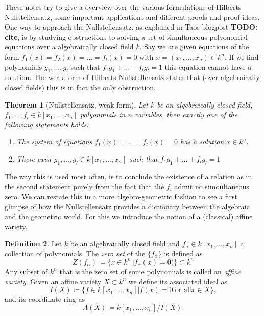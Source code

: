 \documentclass[11pt, a4paper, english, twoside]{article}
\theoremstyle{plain}
\newtheorem{theorem}{Theorem}[section]
\theoremstyle{definition}
\newtheorem{definition}[theorem]{Definition}
\begin{document}

These notes try to give a overview over the various formulations of Hilberts Nullstellensatz, some important applications and different proofs and proof-ideas.
One way to approach the Nullstellensatz, as explained in Taos blogpost \textbf{TODO: cite}, is by studying obstructions to solving a set of simultaneous polyonomial equations over a algebraically closed field $k$.
Say we are given equations of the form $f_1(x) = f_2(x) = \dots = f_l(x) = 0$ with $x = (x_1, \dots, x_n) \in k^n$. If we find polynomials $g_1, \dots, g_l$ such that $f_1g_1 + \dots + f_lg_l = 1$ this equation cannot have a
solution. The weak form of Hilberts Nullstellensatz states that (over algebraically closed fields) this is in fact the only obstruction.

\begin{theorem}[Nullstellensatz, weak form]
    Let $k$ be an algebraically closed field, $f_1,\dots,f_l \in k[x_1,\dots,x_n]$ polyonmials in $n$ variables, then exactly one of the following statements holds:
    \begin{enumerate}
        \item The system of equations $f_1(x) = \dots =f_l(x) = 0$ has a solution $x \in k^n$.
        \item There exist $g_1, \dots, g_l \in k[x_1,\dots,x_n]$ such that $f_1g_1 + \dots + f_lg_l = 1$
    \end{enumerate}
\end{theorem}
The way this is used most often, is to conclude the existence of a relation as in the second statement purely from the fact that the $f_i$ admit no simoultaneous zero.
We can restate this in a more algebro-geometric fashion to see a first glimpse of how the Nullstellensatz provides a dictionary between the algebraic and the geometric world. For this we introduce the notion of a 
(classical) affine variety.

\begin{definition}
    Let $k$ be an algebraically closed field and $f_\alpha \in k[x_1,\dots,x_n]$ a collection of polynomials. The \emph{zero set} of the $\{f_\alpha\}$ is defined as
    \[
        Z({f_\alpha}) \coloneqq \{ x \in k^n \,| f_\alpha(x) = 0) \} \subset k^n
    \]
    Any subset of $k^n$ that is the zero set of some polynomials is called an \emph{affine variety}.
    Given an affine variety $X \subset k^n$ we define its associated ideal as
    \[ 
        I(X) \coloneqq \{f \in k[x_1,\dots,x_n] | f(x) = 0 \text{for all} x \in X \},
    \]
    and its coordinate ring as
    \[
        A(X) \coloneqq k[x_1,\dots,x_n]/I(X).
    \]
\end{definition}
\end{document}
